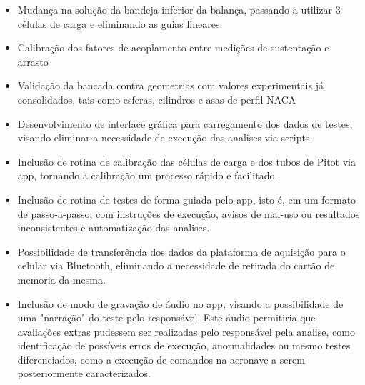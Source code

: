 \begin{itemize}
    \item Mudança na solução da bandeja inferior da balança, passando a utilizar 3 células de carga e eliminando as guias lineares.
    \item Calibração dos fatores de acoplamento entre medições de sustentação e arrasto
    \item Validação da bancada contra geometrias com valores experimentais já consolidados, tais como esferas, cilindros e asas de perfil NACA
    \item Desenvolvimento de interface gráfica para carregamento dos dados de testes, visando eliminar a necessidade de execução das analises via scripts.
    \item Inclusão de rotina de calibração das células de carga e dos tubos de Pitot via app, tornando a calibração um processo rápido e facilitado.
    \item Inclusão de rotina de testes de forma guiada pelo app, isto é, em um formato de passo-a-passo, com instruções de execução, avisos de mal-uso ou resultados inconsistentes e automatização das analises.
    \item Possibilidade de transferência dos dados da plataforma de aquisição para o celular via Bluetooth, eliminando a necessidade de retirada do cartão de memoria da mesma.
    \item Inclusão de modo de gravação de áudio no app, visando a possibilidade de uma "narração" do teste pelo responsável. Este áudio permitiria que avaliações extras pudessem ser realizadas pelo responsável pela analise, como identificação de possíveis erros de execução, anormalidades ou mesmo testes diferenciados, como a execução de comandos na aeronave a serem posteriormente caracterizados. 
\end{itemize}

